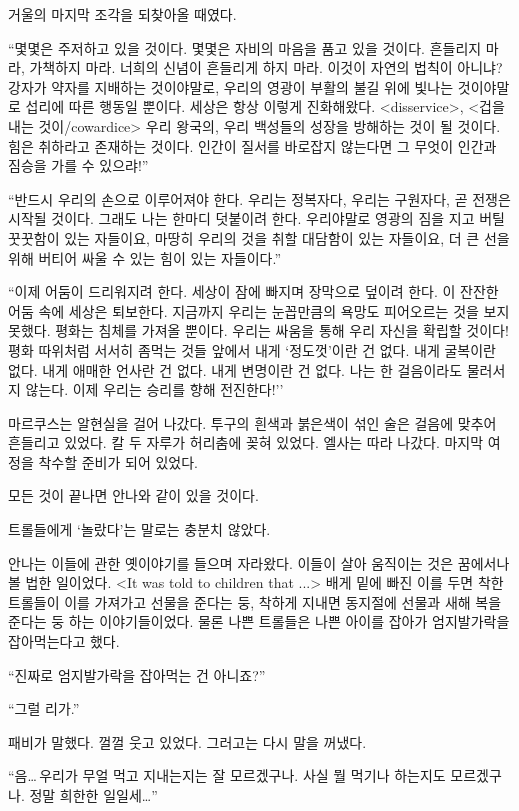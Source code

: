 거울의 마지막 조각을 되찾아올 때였다.

``몇몇은 주저하고 있을 것이다. 몇몇은 자비의 마음을 품고 있을 것이다. 흔들리지 마라, 가책하지 마라. 너희의 신념이 흔들리게 하지 마라. 이것이 자연의 법칙이 아니냐? 강자가 약자를 지배하는 것이야말로, 우리의 영광이 부활의 불길 위에 빛나는 것이야말로 섭리에 따른 행동일 뿐이다. 세상은 항상 이렇게 진화해왔다. <disservice>, <겁을 내는 것이/cowardice> 우리 왕국의, 우리 백성들의 성장을 방해하는 것이 될 것이다. 힘은 취하라고 존재하는 것이다. 인간이 질서를 바로잡지 않는다면 그 무엇이 인간과 짐승을 가를 수 있으랴!''

``반드시 우리의 손으로 이루어져야 한다. 우리는 정복자다, 우리는 구원자다, 곧 전쟁은 시작될 것이다. 그래도 나는 한마디 덧붙이려 한다. 우리야말로 영광의 짐을 지고 버틸 꿋꿋함이 있는 자들이요, 마땅히 우리의 것을 취할 대담함이 있는 자들이요, 더 큰 선을 위해 버티어 싸울 수 있는 힘이 있는 자들이다.''

``이제 어둠이 드리워지려 한다. 세상이 잠에 빠지며 장막으로 덮이려 한다. 이 잔잔한 어둠 속에 세상은 퇴보한다. 지금까지 우리는 눈꼽만큼의 욕망도 피어오르는 것을 보지 못했다. 평화는 침체를 가져올 뿐이다. 우리는 싸움을 통해 우리 자신을 확립할 것이다! 평화 따위처럼 서서히 좀먹는 것들 앞에서 내게 `정도껏'이란 건 없다. 내게 굴복이란 없다. 내게 애매한 언사란 건 없다. 내게 변명이란 건 없다. 나는 한 걸음이라도 물러서지 않는다. 이제 우리는 승리를 향해 전진한다!''

마르쿠스는 알현실을 걸어 나갔다. 투구의 흰색과 붉은색이 섞인 술은 걸음에 맞추어 흔들리고 있었다. 칼 두 자루가 허리춤에 꽂혀 있었다. 엘사는 따라 나갔다. 마지막 여정을 착수할 준비가 되어 있었다.

모든 것이 끝나면 안나와 같이 있을 것이다.

\textbreak

트롤들에게 `놀랐다'는 말로는 충분치 않았다.

안나는 이들에 관한 옛이야기를 들으며 자라왔다. 이들이 살아 움직이는 것은 꿈에서나 볼 법한 일이었다. <It was told to children that ...> 배게 밑에 빠진 이를 두면 착한 트롤들이 이를 가져가고 선물을 준다는 둥, 착하게 지내면 동지절에 선물과 새해 복을 준다는 둥 하는 이야기들이었다. 물론 나쁜 트롤들은 나쁜 아이를 잡아가 엄지발가락을 잡아먹는다고 했다.

``진짜로 엄지발가락을 잡아먹는 건 아니죠?''

``그럴 리가.''

패비가 말했다. 껄껄 웃고 있었다. 그러고는 다시 말을 꺼냈다.

``음\ldots\,우리가 무얼 먹고 지내는지는 잘 모르겠구나. 사실 뭘 먹기나 하는지도 모르겠구나. 정말 희한한 일일세\ldots''

